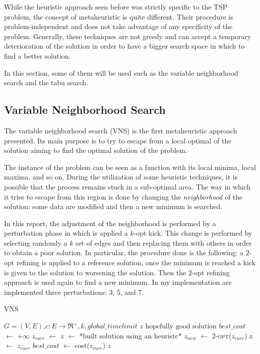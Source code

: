While the heuristic approach seen before was strictly specific to the TSP problem, the concept of metaheuristic is quite different. Their procedure is problem-independent and does not take advantage of any specificity of the problem. Generally, these techniques are not greedy and can accept a temporary deterioration of the solution in order to have a bigger search space in which to find a better solution.

In this section, some of them will be used such as the variable neighborhood search and the tabu search.

\subsection{Variable Neighborhood Search}
\label{sec:VNS}
The variable neighborhood search (VNS) is the first metaheuristic approach presented. Its main purpose is to try to escape from a local optimal of the solution aiming to find the optimal solution of the problem. 

The instance of the problem can be seen as a function with its local minima, local maxima, and so on. During the utilization of some heuristic techniques, it is possible that the process remains stuck in a sub-optimal area. The way in which it tries to escape from this region is done by changing the \textit{neighborhood} of the solution: some data are modified and then a new minimum is searched.

In this report, the adjustment of the neighborhood is performed by a perturbation phase in which is applied a $k$-opt kick. This change is performed by selecting randomly a $k$ set of edges and then replacing them with others in order to obtain a poor solution. In particular, the procedure done is the following: a $2$-opt refining is applied to a reference solution, once the minimum is reached a kick is given to the solution to worsening the solution. Then the $2$-opt refining approach is used again to find a new minimum. In my implementation are implemented three perturbations: 3, 5, and 7.

\begin{algorithm}
	\caption{VNS}\label{algo:vns}
	\begin{algorithmic}[1]
		\Require $G=(V,E)$,$ c:E\rightarrow \Re^+, k, global\_timelimit$
		\Ensure $z\text{ hopefully good solution}$
		\State $best\_cost$ $\gets$ $+\infty$
		\State $z_{curr}$ $\gets$ $z$ $\gets$ *built solution using an heuristc*
			\State $z_{new}$ $\gets$ \textsc{2-opt($z_{curr}$)}
				\State z $\gets$ $z_{curr}$
				\State $best\_cost$ $\gets$ cost($z_{curr}$)
			\EndIf
		\EndWhile
		\State \Return $z$
	\end{algorithmic}
\end{algorithm}


